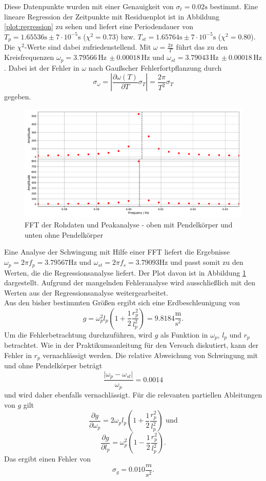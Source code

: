 Diese Datenpunkte wurden mit einer Genauigkeit von $\sigma_{t} = 0.02\text{s}$ bestimmt. Eine lineare Regression der Zeitpunkte mit Residuenplot ist in Abbildung \ref{plot:regression} zu sehen und liefert eine Periodendauer von $T_p = 1.65536 \text{s} \pm 7\cdot 10^{-5} \text{s}$ ($\chi^2 = 0.73$) bzw. $T_{st} = 1.65764 \text{s} \pm 7\cdot 10^{-5}\text{s}$ ($\chi^2 = 0.80$). Die $\chi^2$-Werte sind dabei zufriedenstellend. Mit $\omega = \frac{2\pi}{T}$ führt das zu den Kreisfrequenzen $\omega_p = 3.79566\, \text{Hz}\, \pm 0.00018\, \text{Hz}$ und $\omega_{st} = 3.79043\, \text{Hz} \,\pm 0.00018\, \text{Hz}$. Dabei ist der Fehler in $\omega$ nach Gaußscher Fehlerfortpflanzung durch
$$ \sigma_\omega = \left| \frac{\partial \omega (T)}{\partial T} \sigma_T \right | = \frac{2\pi}{T^2} \sigma_T $$
gegeben.

\begin{figure}[h]
	\centering
	\includegraphics[width = \textwidth]{plots/fft.pdf}
	\caption{FFT der Rohdaten und Peakanalyse - oben mit Pendelkörper und unten ohne Pendelkörper}\label{plot:fft}
\end{figure}

Eine Analyse der Schwingung mit Hilfe einer FFT liefert die Ergebnisse $\omega_p = 2\pi f_p =  3.79567 \text{Hz}$ und $\omega_{st} = 2\pi f_s = 3.79093 \text{Hz}$ und passt somit zu den Werten, die die Regressionsanalyse liefert. Der Plot davon ist in Abbildung \ref{plot:fft} dargestellt. Aufgrund der mangelnden Fehleranalyse wird ausschließlich mit den Werten aus der Regressionsanalyse weitergearbeitet. \\
Aus den bisher bestimmten Größen ergibt sich eine Erdbeschleunigung von 
$$ g = \omega_p^2l_p \left( 1 + \frac 12 \frac{r_p^2}{l_p^2} \right) = 9.8184 \frac{\text{m}}{\text{s}^2}\text{.}$$
Um die Fehlerbetrachtung durchzuführen, wird $g$ als Funktion in $\omega_p$, $l_p$ und $r_p$ betrachtet. Wie in der Praktikumsanleitung für den Versuch diskutiert, kann der Fehler in $r_p$ vernachlässigt werden. Die relative Abweichung von Schwingung mit und ohne Pendelkörper beträgt
$$\frac{\lvert \omega_p - \omega_{st}\rvert}{\omega_p} = 0.0014$$
und wird daher ebenfalls vernachlässigt. Für die relevanten partiellen Ableitungen von $g$ gilt
$$\frac{\partial g}{\partial \omega_p} = 2\omega_p l_p \left(1+\frac 12 \frac{r_p^2}{l_p^2}\right) \text{ und}$$
$$\frac{\partial g}{\partial l_p} = \omega_p^2 \left(1-\frac 12 \frac{r_p^2}{l_p^2}\right)\text{.}$$
Das ergibt einen Fehler von
$$\sigma_g = 0.010 \frac{m}{s^2}\text{.}$$


